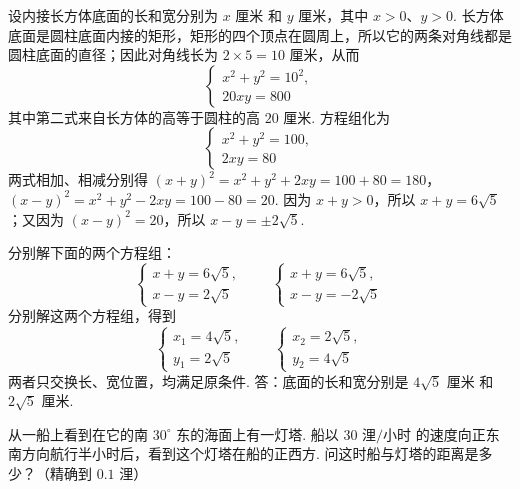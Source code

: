 \begin{solution}
设内接长方体底面的长和宽分别为 \(x\text{ 厘米}\) 和 \(y\text{ 厘米}\)，其中 \(x>0\)、\(y>0\). 长方体底面是圆柱底面内接的矩形，矩形的四个顶点在圆周上，所以它的两条对角线都是圆柱底面的直径；因此对角线长为 \(2\times5=10\text{ 厘米}\)，从而
\[
\begin{cases}
x^{2}+y^{2}=10^{2},\\
20xy=800
\end{cases}
\]
其中第二式来自长方体的高等于圆柱的高 \(20\text{ 厘米}\). 方程组化为
\[
\begin{cases}
x^{2}+y^{2}=100,\\
2xy=80
\end{cases}
\]
两式相加、相减分别得
\((x+y)^2=x^2+y^2+2xy=100+80=180\)，\((x-y)^2=x^2+y^2-2xy=100-80=20\).
因为 \(x+y>0\)，所以 \(x+y=6\sqrt5\)；又因为 \((x-y)^2=20\)，所以 \(x-y=\pm2\sqrt5\).

分别解下面的两个方程组：
\[
\begin{cases}
x+y=6\sqrt5,\\
x-y=2\sqrt5
\end{cases}
\qquad
\begin{cases}
x+y=6\sqrt5,\\
x-y=-2\sqrt5
\end{cases}
\]
分别解这两个方程组，得到
\[
\begin{cases}
x_1=4\sqrt5,\\
y_1=2\sqrt5
\end{cases}
\qquad
\begin{cases}
x_2=2\sqrt5,\\
y_2=4\sqrt5
\end{cases}
\]
两者只交换长、宽位置，均满足原条件. 答：底面的长和宽分别是 \(4\sqrt5\text{ 厘米}\) 和 \(2\sqrt5\text{ 厘米}\).
\end{solution}

\begin{problem}
从一船上看到在它的南 \(30^{\circ}\) 东的海面上有一灯塔. 船以 \(30\text{ 浬/小时}\) 的速度向正东南方向航行半小时后，看到这个灯塔在船的正西方. 问这时船与灯塔的距离是多少？（精确到 \(0.1\text{ 浬}\)）
\end{problem}

